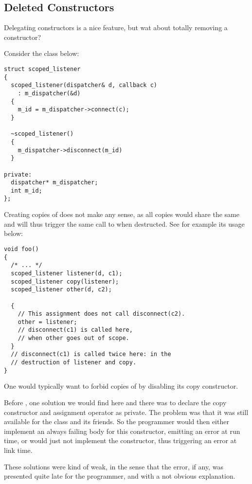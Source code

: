 \subsection{Deleted Constructors}

Delegating constructors is a nice feature, but wat about totally
removing a constructor?

Consider the class below:

\begin{lstlisting}
struct scoped_listener
{
  scoped_listener(dispatcher& d, callback c)
    : m_dispatcher(&d)
  {
    m_id = m_dispatcher->connect(c);
  }

  ~scoped_listener()
  {
    m_dispatcher->disconnect(m_id)
  }

private:
  dispatcher* m_dispatcher;
  int m_id;
};
\end{lstlisting}

Creating copies of  does not make any sense, as
all copies would share the same  and will thus trigger the
same call to  when destructed. See for example
its usage below:

\begin{lstlisting}
void foo()
{
  /* ... */
  scoped_listener listener(d, c1);
  scoped_listener copy(listener);
  scoped_listener other(d, c2);

  {
    // This assignment does not call disconnect(c2).
    other = listener;
    // disconnect(c1) is called here,
    // when other goes out of scope.
  }
  // disconnect(c1) is called twice here: in the
  // destruction of listener and copy.
}
\end{lstlisting}

One would typically want to forbid copies of  by
disabling its copy constructor.

Before , one solution we would find here and there was to
declare the copy constructor and assignment operator as private. The
problem was that it was still available for the class and its
friends. So the programmer would then either implement an always
failing body for this constructor, emitting an error at run time, or
would just not implement the constructor, thus triggering an error at
link time.

These solutions were kind of weak, in the sense that the error, if
any, was presented quite late for the programmer, and with a not
obvious explanation.

